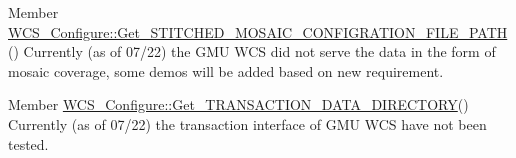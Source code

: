 \label{todo__todo000001}
\hypertarget{todo__todo000001}{}
 
\begin{DoxyDescription}
\item[Member \hyperlink{classWCS__Configure_ae0fc8963b3530a687c0b6fca39e28519}{WCS\_\-Configure::Get\_\-STITCHED\_\-MOSAIC\_\-CONFIGRATION\_\-FILE\_\-PATH}() ]Currently (as of 07/22) the GMU WCS did not serve the data in the form of mosaic coverage, some demos will be added based on new requirement.
\end{DoxyDescription}

\label{todo__todo000002}
\hypertarget{todo__todo000002}{}
 
\begin{DoxyDescription}
\item[Member \hyperlink{classWCS__Configure_af82cfb1889f6ba7ce9a44dc644f2badc}{WCS\_\-Configure::Get\_\-TRANSACTION\_\-DATA\_\-DIRECTORY}() ]Currently (as of 07/22) the transaction interface of GMU WCS have not been tested.
\end{DoxyDescription}